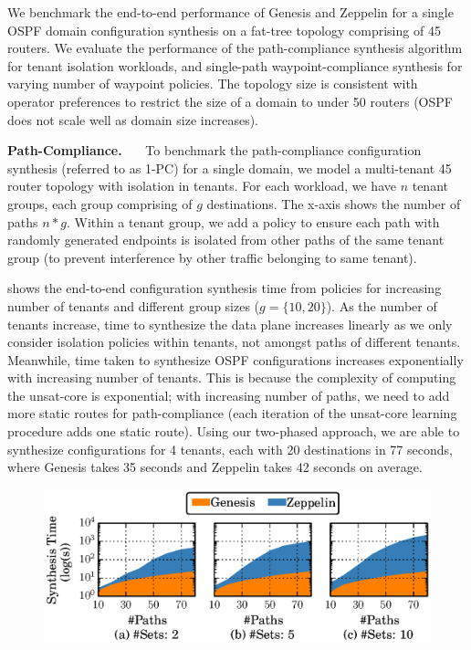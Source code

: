 We benchmark the end-to-end performance of Genesis and Zeppelin
for a single OSPF domain configuration  synthesis on a fat-tree 
topology comprising of 45 routers. We evaluate the performance
of the path-compliance synthesis algorithm for tenant 
isolation workloads, and single-path waypoint-compliance 
synthesis for varying number of waypoint policies.
The topology size is consistent with operator preferences to restrict
the size of a domain to under 50 routers (OSPF does not scale
well as domain size increases).

\noindent\textbf{Path-Compliance.}~~~
To benchmark the path-compliance 
configuration synthesis (referred to as 1-PC) 
for a single domain, we 
model a multi-tenant 45 router topology with 
isolation in tenants. For each 
workload, we have $n$ tenant groups, 
each group comprising of $g$ destinations. 
The x-axis shows the number of paths $n * g$. 
Within a tenant group, we add a policy to ensure
each path with randomly generated endpoints 
is isolated from other paths of the same tenant group 
(to prevent interference by other traffic belonging to
same tenant).  

shows the end-to-end configuration synthesis time from policies 
for increasing number of tenants and different group sizes ($g =
\{10,20\}$). As the number of tenants increase, time to 
synthesize the data plane increases linearly as we only 
consider isolation policies within tenants, not amongst paths 
of different tenants. Meanwhile, time taken to synthesize 
OSPF configurations increases exponentially with increasing 
number of tenants. This is because the complexity of computing 
the unsat-core is exponential; with increasing number of 
paths, we need to add more static routes for 
path-compliance (each iteration of the unsat-core learning
procedure adds one static route). Using our two-phased approach,
we are able to synthesize configurations for 4 tenants, each with
20 destinations in 77 seconds, where Genesis takes 35 seconds and
Zeppelin takes 42 seconds on average. 


\begin{figure}
	\begin{center}
		\includegraphics[width=0.6\columnwidth]{figures/ospfwaypoint.eps}
	\end{center} 
\end{figure}

